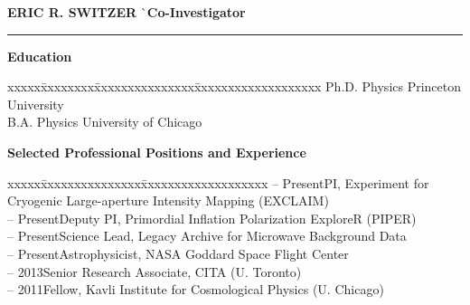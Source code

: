 \documentclass[12pt]{article}
\begin{document}
\vspace{-3mm}
\noindent
\begin{tabbing}
{\bf ERIC R. SWITZER} \` \small{{\bf Co-Investigator}} \\
\end{tabbing}
\vspace{-7mm}
\hrule height 0.7pt

\vspace{5mm}
\addressminimal{\lastupdated}

\small{
\noindent
{\bf Education}
\vspace{-3mm}
\begin{tabbing}
xxxxx\=xxxxxxxx\=xxxxxxxxxxxxxxx\=xxxxxxxxxxxxxxxxxxx\kill
{} \> Ph.D. Physics \> Princeton University \\
 \> B.A. Physics \> University of Chicago \\
\end{tabbing}}

\vspace{-5mm}
\small{
\noindent
{\bf Selected Professional Positions and Experience}
\vspace{-3mm}
\begin{tabbing}
xxxxx\=xxxxxxxxxxxxxxx\=xxxxxxxxxxxxxxxxxxx\kill
{} -- Present\>PI, Experiment for Cryogenic Large-aperture Intensity Mapping (EXCLAIM) \\
 -- Present\>Deputy PI, Primordial Inflation Polarization ExploreR (PIPER) \\
 -- Present\>Science Lead, Legacy Archive for Microwave Background Data \\
 -- Present\>Astrophysicist, NASA Goddard Space Flight Center \\
 -- 2013\>Senior Research Associate, CITA (U. Toronto) \\
 -- 2011\>Fellow, Kavli Institute for Cosmological Physics (U. Chicago) \\
\end{tabbing}}
\end{document}
